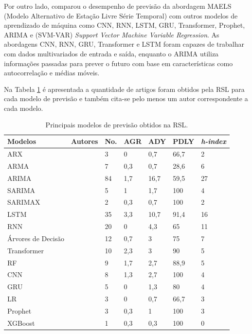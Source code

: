 Por outro lado,  comparou o desempenho de previsão da abordagem MAELS (Modelo Alternativo de Estação Livre Série Temporal) com outros modelos de aprendizado de máquina como CNN, RNN, LSTM, GRU, Transformer, Prophet, ARIMA e (SVM-VAR) \textit{Support Vector Machine Variable Regression}. As abordagens CNN, RNN, GRU, Transformer e LSTM foram capazes de trabalhar com dados multivariados de entrada e saída, enquanto o ARIMA utiliza informações passadas para prever o futuro com base em características como autocorrelação e médias móveis. 

Na Tabela \ref{tb:mode} é apresentada a quantidade de artigos foram obtidos pela RSL para cada modelo de previsão e também cita-se pelo menos um autor correspondente a cada modelo.

\begin{table}[!htb]
	\centering
	\caption{Principais modelos de previsão obtidos na RSL.}\label{tb:mode}
	\small %
	\begin{tabular}{lllllll}
		\toprule
		Modelos & Autores & No. & AGR & ADY & PDLY & \textit{h-index} \\
		\midrule
		ARX & \citeonline{2-s2.0-85051469381} & 3 & 0 & 0,7 & 66,7 & 2 \\	
		ARMA & \citeonline{2-s2.0-85038637324} & 7 & 0,3 & 0,7 & 28,6 & 6 \\
		ARIMA & \citeonline{2-s2.0-85069459067} & 84 & 1,7 & 16,7 & 59,5 & 27 \\
		SARIMA & \citeonline{2-s2.0-85128561644} & 5 & 1 & 1,7 & 100 & 4 \\
		SARIMAX & \citeonline{2-s2.0-85099424908} & 2 & 0,3 & 0,7 & 100 & 2 \\	
		LSTM & \citeonline{WOS:000529902300014} & 35 & 3,3 & 10,7 & 91,4 & 16 \\
		RNN & \citeonline{2-s2.0-85067419084} & 20 & 0 & 4,3 & 65 & 11 \\
		Árvores de Decisão & \citeonline{2-s2.0-85054695177} & 12 & 0,7 & 3 & 75 & 7 \\
		Transformer & \citeonline{2-s2.0-85045193200} & 10 & 2,3 & 3 & 90 & 5 \\
		RF & \citeonline{2-s2.0-85135210428} & 9 & 1,7 & 2,7 & 88,9 & 5 \\
		CNN & \citeonline{WOS:000841076700002} & 8 & 1,3 & 2,7 & 100 & 4 \\
		GRU & \citeonline{2-s2.0-85135210428} & 5 & 0 & 1,3 & 80 & 4 \\
		LR & \citeonline{2-s2.0-85125426780} & 3 & 0 & 0,7 & 66,7 & 3 \\
		Prophet & \citeonline{2-s2.0-85092514286} & 3 & 0,3 & 1 & 100 & 3 \\
		XGBoost & \citeonline{2-s2.0-85130441623} & 1 & 0,3 & 0,3 & 100 & 0 \\
		\bottomrule
	\end{tabular}
\end{table}

